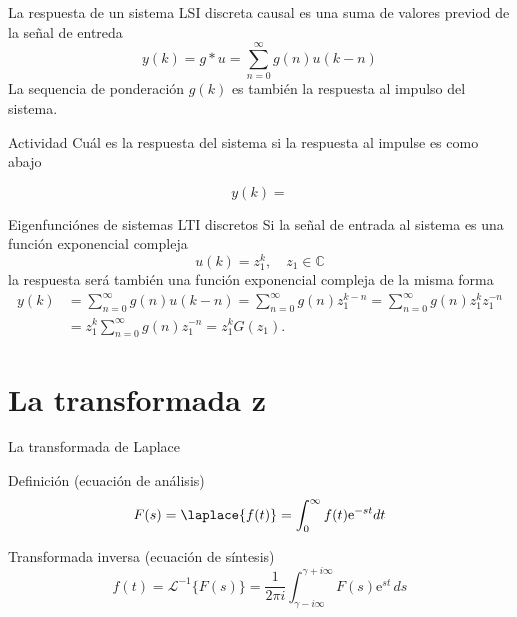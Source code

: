 \documentclass[presentation,aspectratio=169]{beamer}
\begin{document}
\begin{frame}[label={sec:orgf471b95}]{La respuesta de un sistema LSI discreta causal es una suma de valores previod de la señal de entreda}
\[ y(k) = g \ast u = \sum_{n=0}^\infty g(n) u(k-n) \]
La sequencia de ponderación \(g(k)\) es también la respuesta al impulso del sistema. 

\alert{Actividad} Cuál es la respuesta del sistema si la respuesta al impulse es como abajo

\begin{center}
\end{center}

\[y(k) = \]
\end{frame}


\begin{frame}[label={sec:orgaf7599e}]{Eigenfunciónes de sistemas LTI discretos}
Si la señal de entrada al sistema es una función exponencial compleja
\[ u(k) = z_1^k, \quad z_1 \in \mathbb{C}  \]
la respuesta será también una función exponencial compleja de la misma forma
\begin{align*}
 y(k) &= \sum_{n=0}^\infty g(n) u(k-n) = \sum_{n=0}^\infty g(n) z_1^{k-n} = \sum_{n=0}^\infty g(n) z_1^{k}z_1^{-n}\\ &=z_1^k \sum_{n=0}^\infty g(n) z_1^{-n} = z_1^k G(z_1).  
 \end{align*}
\end{frame}

\section{La transformada z}
\label{sec:orgff71a59}
\begin{frame}[label={sec:orge7fd2fc}]{La transformada de Laplace}
\begin{block}{Definición (ecuación de análisis)}
\[ F(s) = \laplace{f(t)} = \int_0^\infty f(t) \mathrm{e}^{-st} dt\]
\end{block}
\begin{block}{Transformada inversa (ecuación de síntesis)}
\[ f(t) = \mathcal{L}^{-1}\{F(s)\} = \frac{1}{2\pi i} \int_{\gamma - i\infty}^{\gamma + i\infty} F(s)\mathrm{e}^{st} \, ds \]
\end{block}
\end{frame}
\end{document}
